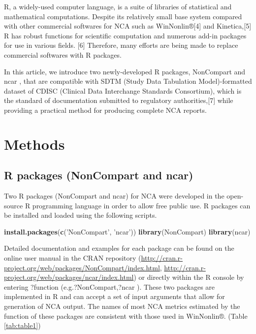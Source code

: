 \documentclass[12pt,]{krantz}
\newenvironment{Shaded}{\begin{snugshade}}{\end{snugshade}}
\newcommand{\KeywordTok}[1]{\textcolor[rgb]{0.13,0.29,0.53}{\textbf{#1}}}
\newcommand{\StringTok}[1]{\textcolor[rgb]{0.31,0.60,0.02}{#1}}
\newcommand{\NormalTok}[1]{#1}
\theoremstyle{definition}
\theoremstyle{definition}
\theoremstyle{definition}
\theoremstyle{remark}
\begin{document}
R, a widely-used computer language, is a suite of libraries of
statistical and mathematical computations. \citep{R-base} Despite its
relatively small base system compared with other commercial softwares
for NCA such as WinNonlin®{[}4{]} and Kinetica,{[}5{]} R has robust
functions for scientific computation and numerous add-in packages for
use in various fields. {[}6{]} Therefore, many efforts are being made to
replace commercial softwares with R packages.

In this article, we introduce two newly-developed R packages, NonCompart
\citep{R-NonCompart} and ncar \citep{R-ncar}, that are compatible with
SDTM (Study Data Tabulation Model)-formatted dataset of CDISC (Clinical
Data Interchange Standards Consortium), which is the standard of
documentation submitted to regulatory authorities,{[}7{]} while
providing a practical method for producing complete NCA reports.

\chapter{Methods}\label{methods}

\section{R packages (NonCompart and
ncar)}\label{r-packages-noncompart-and-ncar}

Two R packages (NonCompart and ncar) for NCA were developed in the
open-source R programming language in order to allow free public use. R
packages can be installed and loaded using the following scripts.

\begin{Shaded}
\begin{Highlighting}[]
\KeywordTok{install.packages}\NormalTok{(}\KeywordTok{c}\NormalTok{(}\StringTok{'NonCompart'}\NormalTok{, }\StringTok{'ncar'}\NormalTok{))}
\KeywordTok{library}\NormalTok{(NonCompart)}
\KeywordTok{library}\NormalTok{(ncar)}
\end{Highlighting}
\end{Shaded}

Detailed documentation and examples for each package can be found on the
online user manual in the CRAN repository
(\url{http://cran.r-project.org/web/packages/NonCompart/index.html},
\url{http://cran.r-project.org/web/packages/ncar/index.html}) or
directly within the R console by entering ?function
(e.g.?NonCompart,?ncar ). These two packages are implemented in R and
can accept a set of input arguments that allow for generation of NCA
output. The names of most NCA metrics estimated by the function of these
packages are consistent with those used in WinNonlin®. (Table
\ref{tab:table1})
\end{document}
